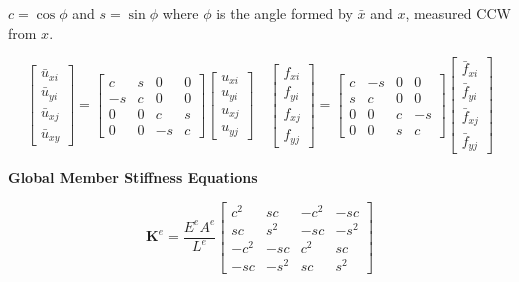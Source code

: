 \documentclass{article}
\begin{document}
\begin{multicols*}{2}
    $c = \cos{\phi}$ and $s = \sin{\phi}$ where $\phi$ is the angle formed by
    $\bar{x}$ and $x$, measured CCW from $x$.\par 
    \begin{equation*}
        \begin{bmatrix}
            \bar{u}_{xi}\\
            \bar{u}_{yi}\\
            \bar{u}_{xj}\\
            \bar{u}_{xy}
        \end{bmatrix}
        =
        \begin{bmatrix}
            c & s & 0 & 0\\
            -s & c & 0 & 0\\
            0 & 0 & c & s\\
            0 & 0 & -s & c
        \end{bmatrix}
        \begin{bmatrix}
            u_{xi}\\
            u_{yi}\\
            u_{xj}\\
            u_{yj}
        \end{bmatrix}
        \quad
        \begin{bmatrix}
            f_{xi}\\
            f_{yi}\\
            f_{xj}\\
            f_{yj}
        \end{bmatrix}
        =
        \begin{bmatrix}
            c & -s & 0 & 0\\
            s & c & 0 & 0\\
            0 & 0 & c & -s\\
            0 & 0 & s & c
        \end{bmatrix}
        \begin{bmatrix}
            \bar{f}_{xi}\\
            \bar{f}_{yi}\\
            \bar{f}_{xj}\\
            \bar{f}_{yj}
        \end{bmatrix}
    \end{equation*}

    \textbf{Global Member Stiffness Equations}\par 
    \begin{equation*}
        \textbf{K}^e = \frac{E^eA^e}{L^e}
        \begin{bmatrix}
            c^2 & sc & -c^2 & -sc\\
            sc & s^2 & -sc & -s^2\\
            -c^2 & -sc & c^2 & sc\\
            -sc & -s^2 & sc & s^2
        \end{bmatrix}
    \end{equation*}

\end{multicols*}  
\end{document}

